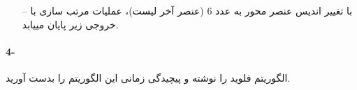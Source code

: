 \documentclass[10pt,a4paper]{article}
\begin{document}
\begin{flushright}
{{{\begin{itemize}
		با اجرای تابع پارتیشن، عناصر لیست به ترتیب زیر مرتب می شوند\\
		\\
		\\
		\item[--] با تغییر اندیس عنصر محور به عدد 6 (عنصر آخر لیست)، عملیات مرتب سازی با خروجی زیر پایان مییابد.\\
		\end{itemize}}
		}}
	\end{flushright}
	
	
	
	
	\paragraph{4-} الگوریتم فلوید را نوشته و پیچیدگی زمانی این الگوریتم را بدست آورید.
	
\end{document}
